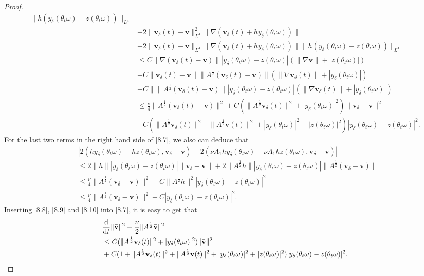 \documentclass{elsarticle}
\theoremstyle{definition}
\numberwithin{equation}{section}
\renewcommand{\d}{{\rm{d}}}
\begin{document}
\begin{proof}
\begin{align}
\|h(y_\delta(\theta_t\omega)-z(\theta_t\omega))\|_{L^4}\nonumber\\
&+2\|\textbf{v}_\delta(t)-\textbf{v}\|_{L^4}^2\|\nabla(\textbf{v}_\delta(t)+hy_\delta(\theta_t\omega))\|\nonumber\\
&+2\|\textbf{v}_\delta(t)-\textbf{v}\|_{L^4}\|\nabla(\textbf{v}_\delta(t)+hy_\delta(\theta_t\omega))\|
\|h(y_\delta(\theta_t\omega)-z(\theta_t\omega))\|_{L^4}\nonumber\\
&\leq C\|\nabla(\textbf{v}_\delta(t)-\textbf{v})\|
|y_\delta(\theta_t\omega)-z(\theta_t\omega)|(\|\nabla\textbf{v}\|+|z(\theta_t\omega)|)\nonumber\\
&+C\|\textbf{v}_\delta(t)-\textbf{v}\|\|A^\frac12(\textbf{v}_\delta(t)-\textbf{v})\|
(\|\nabla\textbf{v}_\delta(t)\|+|y_\delta(\theta_t\omega)|)
\nonumber\\
&+C\|\|A^\frac12(\textbf{v}_\delta(t)-\textbf{v})\||y_\delta(\theta_t\omega)-z(\theta_t\omega)|
(\|\nabla\textbf{v}_\delta(t)\|+|y_\delta(\theta_t\omega)|)
\nonumber\\
&\leq \frac{\nu}{4}\|A^\frac12(\textbf{v}_\delta(t)-\textbf{v})\|^2
+C(\|A^\frac12\textbf{v}_\delta(t)\|^2+|y_\delta(\theta_t\omega)|^2)\|\textbf{v}_\delta-\textbf{v}\|^2\nonumber\\
&+C(\|A^\frac12\textbf{v}_\delta(t)\|^2+\|A^\frac12\textbf{v}(t)\|^2+|y_\delta(\theta_t\omega)|^2
+|z(\theta_t\omega)|^2)|y_\delta(\theta_t\omega)-z(\theta_t\omega)|^2.
\end{align}
For the last two terms in the right hand side of \eqref{8.7}, we also can deduce that
\begin{align}\label{8.10}
&|2(hy_\delta (\theta_t\omega)-hz(\theta_t\omega),\textbf{v}_\delta-\textbf{v})-  2(\nu A_1hy_\delta(\theta_t\omega)-\nu A_1hz(\theta_t\omega),\textbf{v}_\delta-\textbf{v})|\nonumber\\
&\leq 2\|h\||y_\delta (\theta_t\omega)-z(\theta_t\omega)|\|\textbf{v}_\delta-\textbf{v}\|
+2\|A^\frac12 h\||y_\delta (\theta_t\omega)-z(\theta_t\omega)|\|A^\frac12(\textbf{v}_\delta-\textbf{v})\|\nonumber\\
&\leq\frac{\nu}{4}\|A^\frac12(\textbf{v}_\delta-\textbf{v})\|^2+
C\|A^\frac12 h\|^2|y_\delta (\theta_t\omega)-z(\theta_t\omega)|^2\nonumber\\
&\leq\frac{\nu}{4}\|A^\frac12(\textbf{v}_\delta-\textbf{v})\|^2+
C|y_\delta (\theta_t\omega)-z(\theta_t\omega)|^2.
\end{align}
Inserting \eqref{8.8}, \eqref{8.9} and \eqref{8.10} into \eqref{8.7}, it is easy to get that
\begin{align}\label{8.11}
&\frac{\d }{\d t}\|\bar{\textbf{v}}\|^2+\frac{\nu}{2}\|A^\frac12\bar{\textbf{v}}\|^2\nonumber\\
&\leq
C(\|A^\frac12\textbf{v}_\delta(t)\|^2+|y_\delta(\theta_t\omega)|^2)\|\bar{\textbf{v}}\|^2\nonumber\\
&+C(1+\|A^\frac12\textbf{v}_\delta(t)\|^2+\|A^\frac12\textbf{v}(t)\|^2+|y_\delta(\theta_t\omega)|^2
+|z(\theta_t\omega)|^2)|y_\delta(\theta_t\omega)-z(\theta_t\omega)|^2.
\end{align}


\end{proof}
\end{document}
